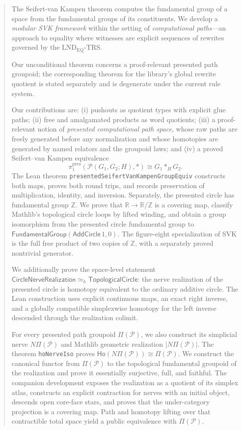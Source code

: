 \documentclass{lmcs}
\theoremstyle{definition}
\theoremstyle{plain}
\theoremstyle{remark}
\newcommand{\piOne}{\pi_1}
\newcommand{\ZZ}{\mathbb{Z}}
\begin{document}
\begin{abstract}
The Seifert-van Kampen theorem computes the fundamental group of a space from the fundamental groups of its constituents. We develop a \emph{modular SVK framework} within the setting of \emph{computational paths}---an approach to equality where witnesses are explicit sequences of rewrites governed by the $\mathrm{LND}_{\mathrm{EQ}}$-TRS.

Our unconditional theorem concerns a proof-relevant presented path groupoid;
the corresponding theorem for the library's global rewrite quotient is stated
separately and is degenerate under the current rule system.

Our contributions are: (i) pushouts as quotient types with explicit glue paths;
(ii) free and amalgamated products as word quotients; (iii) a proof-relevant
notion of \emph{presented computational path space}, whose raw paths are freely
generated before any normalization and whose homotopies are generated by named
relators and the groupoid laws; and (iv) a proved Seifert--van Kampen
equivalence
\[
\piOne^{\mathrm{pres}}(\mathcal P(G_1,G_2;H),*)
\cong G_1 *_H G_2 .
\]
The Lean theorem \texttt{presentedSeifertVanKampenGroupEquiv} constructs both
maps, proves both round trips, and records preservation of multiplication,
identity, and inversion.  Separately, the presented circle has fundamental
group \(\ZZ\).  We prove that \(\mathbb R\to\mathbb R/\mathbb Z\) is a
covering map, classify Mathlib's topological circle loops by lifted winding,
and obtain a group isomorphism from the presented circle fundamental group to
\(\mathsf{FundamentalGroup}(\mathsf{AddCircle}\,1,0)\).  The figure-eight
specialization of SVK is the full free product of two copies of \(\ZZ\), with a
separately proved nontrivial generator.

We additionally prove the space-level statement
\(\mathsf{CircleNerveRealization}\simeq_h\mathsf{TopologicalCircle}\):
the nerve realization of the presented circle is homotopy equivalent to the
ordinary additive circle.  The Lean construction uses explicit continuous maps,
an exact right inverse, and a globally compatible simplexwise homotopy for the
left inverse descended through the realization colimit.

For every presented path groupoid \(\Pi(\mathcal P)\), we also construct its
simplicial nerve \(N\Pi(\mathcal P)\) and Mathlib geometric realization
\(\lvert N\Pi(\mathcal P)\rvert\).  The theorem \texttt{hoNerveIso} proves
\(\mathsf{Ho}(N\Pi(\mathcal P))\cong\Pi(\mathcal P)\).  We construct the
canonical functor from \(\Pi(\mathcal P)\) to the topological fundamental
groupoid of the realization and prove it essentially surjective, full, and
faithful.  The companion development exposes the realization as a quotient of
its simplex atlas, constructs an explicit contraction for nerves with an
initial object, descends open core-face stars, and proves that the
under-category projection is a covering map.  Path and homotopy lifting over
that contractible total space yield a public equivalence with
\(\Pi(\mathcal P)\).


\end{abstract}
\end{document}
